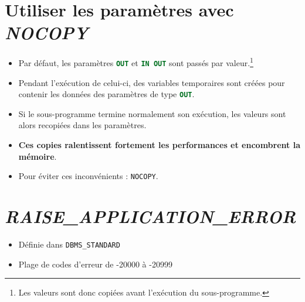 \documentclass[10pt]{beamer}
\begin{document}
\section{Utiliser les paramètres avec \textit{NOCOPY}}
\begin{frame}{\secname}
    \begin{itemize}
        \item Par défaut, les paramètres \lstinline[language=sql]!OUT! et \lstinline[language=sql]!IN OUT! sont passés par valeur.\footnote{Les valeurs sont donc copiées avant l’exécution du  sous-programme.}
        \item Pendant l’exécution de celui-ci, des variables temporaires sont créées pour contenir les données des paramètres de type \lstinline[language=sql]!OUT!.
        \item Si le sous-programme termine normalement son exécution, les valeurs sont alors recopiées dans les paramètres.
        \item \textbf{Ces copies ralentissent fortement les performances et encombrent la mémoire}.
        \item Pour éviter ces inconvénients : \lstinline[language=sql]!NOCOPY!.
    \end{itemize}
\end{frame}

\section{\textit{RAISE\_APPLICATION\_ERROR}}
\begin{frame}{\secname}
    
    \begin{itemize}
        \item Définie dans \lstinline[language=sql]!DBMS_STANDARD!
        \item Plage de codes d'erreur de -20000 à -20999
    \end{itemize}
\end{frame}

\begin{frame}[allowframebreaks]{\secname}
    
\end{frame}

\begin{frame}{\secname}
    
\end{frame}
\end{document}
